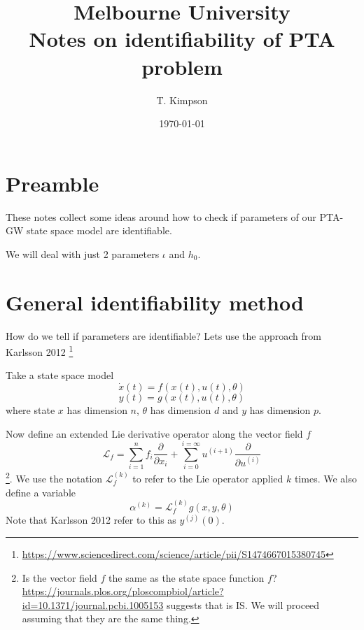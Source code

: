 \documentclass{tufte-handout} %
\title{	
	\normalfont\normalsize 
	{Melbourne University} \\ [0pt] %
	\huge Notes on identifiability of PTA problem%
}\author{T. Kimpson} %
\date{\vspace{-5pt}\normalsize\today} %
\begin{document}
\justifying 
\maketitle


\tableofcontents




\section{Preamble}


These notes collect some ideas around how to check if parameters of our PTA-GW state space model are identifiable. \newline

\noindent We will deal with just 2 parameters $\iota$ and $h_0$.

 

\section{General identifiability method}\label{sec:intro}

How do we tell if parameters are identifiable? Lets use the approach from Karlsson 2012 \footnote{\url{https://www.sciencedirect.com/science/article/pii/S1474667015380745}}

\noindent Take a state space model
\begin{equation}
	\dot{x}(t) = f(x(t), u(t), \theta)
\end{equation}
\begin{equation}
	y(t) = g(x(t), u(t), \theta)
\end{equation}
where state $x$ has dimension $n$, $\theta$ has dimension $d$ and $y$ has dimension $p$. \newline 

\noindent Now define an extended Lie derivative operator along the vector field $f$
\begin{equation}
	\mathcal{L}_f = \sum_{i=1}^{n} f_i \frac{\partial}{\partial x_i} + \sum_{i=0}^{i = \infty} u^{(i+1)} \frac{\partial}{\partial u^{(i)}}
\end{equation}
\footnote{Is the vector field $f$ the same as the state space function $f$? \url{https://journals.plos.org/ploscompbiol/article?id=10.1371/journal.pcbi.1005153} suggests that is IS. We will proceed assuming that they are the same thing.}. We use the notation $\mathcal{L}_f^{(k)}$ to refer to the Lie operator applied $k$ times. We also define a variable
\begin{equation}
	\alpha^{(k)} = \mathcal{L}_f^{(k)} g(x,y,\theta)
\end{equation}
Note that Karlsson 2012 refer to this as $y^{(j)}(0)$. \newline 
\end{document}
